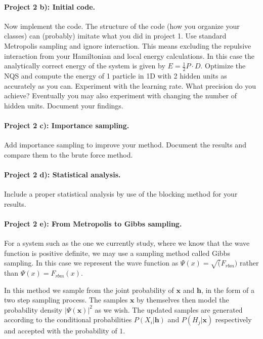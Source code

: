 \documentclass[%
oneside,                 %
final,                   %
10pt]{article}
\begin{document}
\paragraph{Project 2 b): Initial code.}
Now implement the code. The structure of the code (how you organize
your classes) can (probably) imitate what you did in project 1.  Use
standard Metropolis sampling and ignore interaction. This means
excluding the repulsive interaction from your Hamiltonian and local
energy calculations. In this case the analytically correct energy of
the system is given by $E=\frac{1}{2}P\cdot D$.  Optimize the NQS and
compute the energy of 1 particle in 1D with 2 hidden units as
accurately as you can. Experiment with the learning rate. What
precision do you achieve?  Eventually you may also experiment with
changing the number of hidden units. Document your findings.

\paragraph{Project 2 c): Importance sampling.}
Add importance sampling to improve your method. Document the results and compare them to the brute force method.

\paragraph{Project 2 d): Statistical analysis.}
Include a proper statistical analysis by use of the blocking method for your results.

\paragraph{Project 2 e): From Metropolis to Gibbs sampling.}
For a system such as the one we currently study, where we know that
the wave function is positive definite, we may use a sampling method
called Gibbs sampling. In this case we represent the wave function as
$\Psi(x) = \sqrt(F_{rbm})$ rather than $\Psi(x) = F_{rbm}(x)$.

In this method we sample from the joint probability of $\mathbf{x}$ and
$\mathbf{h}$, in the form of a two step sampling process. The samples $\mathbf{x}$
by themselves then model the probability density $|\Psi(\mathbf{x})|^2$ as we
wish.  The updated samples are generated according to the conditional
probabilities $P(X_i|\mathbf{h})$ and $P(H_j|\mathbf{x})$ respectively and accepted
with the probability of $1$.
\end{document}
